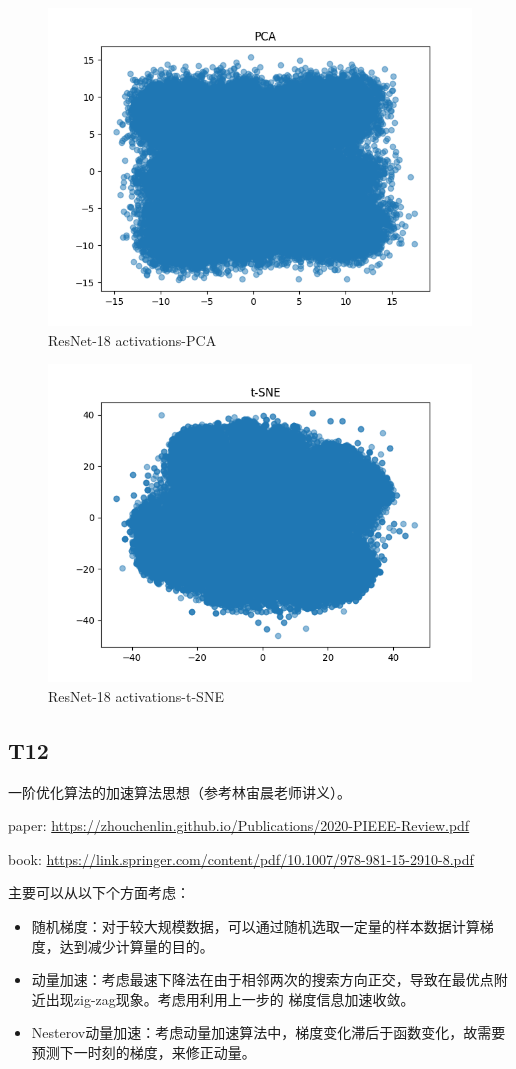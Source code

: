 \documentclass[a4paper]{article}
\begin{document}
    \begin{figure}[h!]
        \centering
        \includegraphics[width=0.5\linewidth]{./figures/pca.png}
        \caption{ResNet-18 activations-PCA}
        \label{fig:pca}
    \end{figure}

    \begin{figure}[h!]
        \centering
        \includegraphics[width=0.5\linewidth]{./figures/tsne.png}
        \caption{ResNet-18 activations-t-SNE}
        \label{fig:tsne}
    \end{figure}


    \subsection*{T12}
    一阶优化算法的加速算法思想（参考林宙晨老师讲义）。

    paper: \url{https://zhouchenlin.github.io/Publications/2020-PIEEE-Review.pdf}

    book: \url{https://link.springer.com/content/pdf/10.1007/978-981-15-2910-8.pdf}


    主要可以从以下个方面考虑：
    \begin{itemize}
        \item 随机梯度：对于较大规模数据，可以通过随机选取一定量的样本数据计算梯度，达到减少计算量的目的。
        \item 动量加速：考虑最速下降法在由于相邻两次的搜索方向正交，导致在最优点附近出现zig-zag现象。考虑用利用上一步的
        梯度信息加速收敛。
        \item Nesterov动量加速：考虑动量加速算法中，梯度变化滞后于函数变化，故需要预测下一时刻的梯度，来修正动量。
    \end{itemize}
\end{document}
